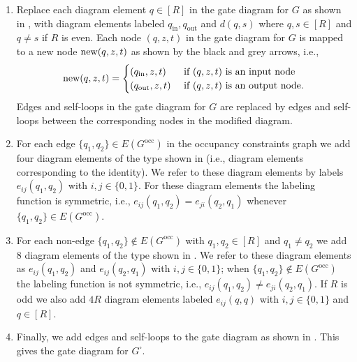 \documentclass[../thesis-main/thesis-main]{subfiles}
\begin{document}
\begin{enumerate}
\item Replace each diagram element $q\in[R]$ in the gate diagram for $G$ as shown in , with diagram elements labeled $q_{\text{in}},q_{\text{out}}$ and $d(q,s)$ where $q,s\in[R]$ and $q\neq s$ if $R$ is even. Each node $(q,z,t)$ in the gate diagram for $G$ is mapped to a new node $\operatorname{new}(q,z,t)$ as shown by the black and grey arrows, i.e., 
\begin{equation}
\operatorname{new}(q,z,t)=\begin{cases}
(q_{\mathrm{in}},z,t) & \text{ if }(q,z,t)\text{ is an input node}\\
(q_{\mathrm{out}},z,t) & \text{ if }(q,z,t)\text{ is an output node}.
\end{cases}\label{eq:node_mapping_G_G_square}
\end{equation}
Edges and self-loops in the gate diagram for $G$ are replaced by edges and self-loops between the corresponding nodes in the modified diagram.
\item For each edge $\{q_{1},q_{2}\}\in E(G^{\text{occ}})$ in the occupancy constraints graph we add four diagram elements of the type shown in  (i.e., diagram elements corresponding to the identity). We refer to these diagram elements by labels $e_{ij}(q_{1},q_{2})$ with $i,j\in\{0,1\}$. For these diagram elements the labeling function is symmetric, i.e., $e_{ij}(q_{1},q_{2})=e_{ji}(q_{2},q_{1})$ whenever $\{q_{1},q_{2}\}\in E(G^{\text{occ}})$.
\item For each non-edge $\{q_{1},q_{2}\}\notin E(G^{\text{occ}})$ with $q_{1},q_{2}\in[R]$ and $q_{1}\neq q_{2}$ we add $8$ diagram elements of the type shown in . We refer to these diagram elements as $e_{ij}(q_{1},q_{2})$ and $e_{ij}(q_{2},q_{1})$ with $i,j\in\{0,1\}$; when $\{q_1,q_2\}\notin E(G^{\text{occ}})$ the labeling function is not symmetric, i.e., $e_{ij}(q_{1},q_{2})\neq e_{ji}(q_{2},q_{1})$. If $R$ is odd we also add $4R$ diagram elements labeled $e_{ij}(q,q)$ with $i,j\in\{0,1\}$ and $q\in[R]$.
\item Finally, we add edges and self-loops to the gate diagram as shown in . This gives the gate diagram for $G^{\square}$.
\end{enumerate}
\end{document}

